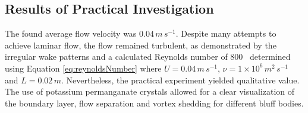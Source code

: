\subsection{Results of Practical Investigation}
\label{sec:resultsPractical}
The found average flow velocity was $0.04\, m\,s^{-1}$. Despite many attempts to achieve laminar flow, the flow remained turbulent, as demonstrated by the irregular wake patterns and a calculated Reynolds number of 800 \textemdash\ determined using Equation \eqref{eq:reynoldsNumber} where $U = 0.04\,m\,s^{-1}$, $\nu = 1 \times 10^6\, m^2\, s^{-1}$ and $L = 0.02\, m$. Nevertheless, the practical experiment yielded qualitative value. The use of potassium permanganate crystals allowed for a clear visualization of the boundary layer, flow separation and vortex shedding for different bluff bodies.



